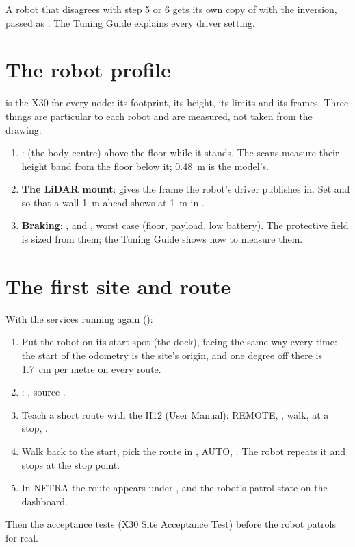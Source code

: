 A robot that disagrees with step 5 or 6 gets its own copy of
 with the inversion, passed as
. The Tuning Guide explains every driver setting.

\section{The robot profile}
\label{sec:i-profile}

 is the X30 for every node: its footprint, its height, its
limits and its frames. Three things are particular to each robot and are measured, not taken
from the drawing:

\begin{enumerate}
  \item \textbf{}:  (the body centre) above the floor while it
    stands. The scans measure their height band from the floor  below it;
    0.48~m is the model's.
  \item \textbf{The LiDAR mount}:  gives the
    frame the robot's driver publishes in. Set  and  so that a
    wall 1~m ahead shows at 1~m in .
  \item \textbf{Braking}: ,  and
    , worst case (floor, payload, low battery). The protective field is sized
    from them; the Tuning Guide shows how to measure them.
\end{enumerate}

\section{The first site and route}

With the services running again ():

\begin{enumerate}
  \item Put the robot on its start spot (the dock), facing the same way every time: the start of
    the odometry is the site's origin, and one degree off there is 1.7~cm per metre on every route.
  \item {}: , source .
  \item Teach a short route with the H12 (User Manual): REMOTE, , walk,  at
    a stop, .
  \item Walk back to the start, pick the route in , AUTO, . The robot repeats
    it and stops at the stop point.
  \item In NETRA the route appears under , and the robot's patrol state on the
    dashboard.
\end{enumerate}

Then the acceptance tests (X30 Site Acceptance Test) before the robot patrols for real.
